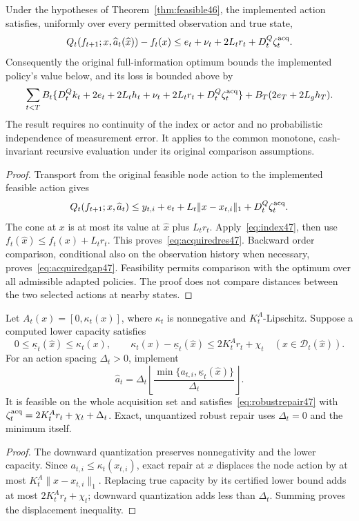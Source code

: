 \begin{theorem}\label{thm:acquired47}
Under the hypotheses of Theorem~\ref{thm:feasible46}, the implemented action satisfies, uniformly over every permitted observation and true state,
\begin{equation}\label{eq:acquiredres47}
 Q_t(f_{t+1};x,\widehat a_t(\widehat x))-f_t(x)
 \le e_t+\nu_t+2L_tr_t+D_t^Q\zeta_t^{\rm acq}.
\end{equation}
Consequently the original full-information optimum bounds the implemented policy's value below, and its loss is bounded above by
\begin{equation}\label{eq:acquiredgap47}
 \sum_{t<T}B_t\{D_t^Qk_t+2e_t+2L_th_t
       +\nu_t+2L_tr_t+D_t^Q\zeta_t^{\rm acq}\}
       +B_T(2e_T+2L_gh_T).
\end{equation}
The result requires no continuity of the index or actor and no probabilistic independence of measurement error. It applies to the common monotone, cash-invariant recursive evaluation under its original comparison assumptions.
\end{theorem}
\begin{proof}
Transport from the original feasible node action to the implemented feasible action gives
\[
 Q_t(f_{t+1};x,\widehat a_t)
 \le y_{t,i}+e_t+L_t\|x-x_{t,i}\|_1+D_t^Q\zeta_t^{\rm acq}.
\]
The cone at $x$ is at most its value at $\widehat x$ plus $L_tr_t$. Apply~\eqref{eq:index47}, then use $f_t(\widehat x)\le f_t(x)+L_tr_t$. This proves~\eqref{eq:acquiredres47}. Backward order comparison, conditional also on the observation history when necessary, proves~\eqref{eq:acquiredgap47}. Feasibility permits comparison with the optimum over all admissible adapted policies. The proof does not compare distances between the two selected actions at nearby states.
\end{proof}

\begin{corollary}\label{cor:capacity47}
Let $A_t(x)=[0,\kappa_t(x)]$, where $\kappa_t$ is nonnegative and $K_t^A$-Lipschitz. Suppose a computed lower capacity satisfies
\[
 0\le\underline\kappa_t(\widehat x)\le\kappa_t(x),\qquad
 \kappa_t(x)-\underline\kappa_t(\widehat x)\le 2K_t^Ar_t+\chi_t
 \quad(x\in\mathcal D_t(\widehat x)).
\]
For an action spacing $\Delta_t>0$, implement
\[
 \widehat a_t=\Delta_t\left\lfloor
   \frac{\min\{a_{t,i},\underline\kappa_t(\widehat x)\}}{\Delta_t}
 \right\rfloor.
\]
It is feasible on the whole acquisition set and satisfies~\eqref{eq:robustrepair47} with
$\zeta_t^{\rm acq}=2K_t^Ar_t+\chi_t+\Delta_t$.
Exact, unquantized robust repair uses $\Delta_t=0$ and the minimum itself.
\end{corollary}
\begin{proof}
The downward quantization preserves nonnegativity and the lower capacity. Since $a_{t,i}\le\kappa_t(x_{t,i})$, exact repair at $x$ displaces the node action by at most $K_t^A\|x-x_{t,i}\|_1$. Replacing true capacity by its certified lower bound adds at most $2K_t^Ar_t+\chi_t$; downward quantization adds less than $\Delta_t$. Summing proves the displacement inequality.
\end{proof}


